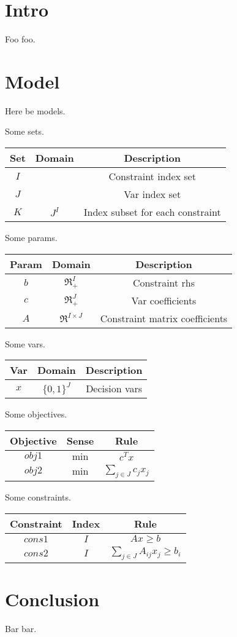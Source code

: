 \documentclass{article}
\begin{document}
\section{Intro}
Foo foo.

\section{Model}
Here be models.

Some sets.
\begin{tabular}{c|c|c} \label{tab:set}
    Set & Domain & Description \\
    \hline
    $I$ & & Constraint index set \\
    $J$ & & Var index set \\
    $K$ & $J^I$ & Index subset for each constraint \\
\end{tabular}

Some params.
\begin{tabular}{c|c|c} \label{tab:param}
    Param & Domain & Description \\
    \hline
    $b$ & $\Re^I_+$ & Constraint rhs \\
    $c$ & $\Re^J_+$ & Var coefficients \\
    $A$ & $\Re^{I \times J}$ & Constraint matrix coefficients \\
\end{tabular}

Some vars.
\begin{tabular}{c|c|c} \label{tab:var}
    Var & Domain & Description \\
    \hline
    $x$ & $\{0, 1\}^J$ & Decision vars \\
\end{tabular}

Some objectives.
\begin{tabular}{c|c|c} \label{tab:objective}
    Objective & Sense & Rule \\
    \hline
    $obj1$ & $\min$ & $c^Tx$ \\
    $obj2$ & $\min$ & $\sum_{j \in J} c_j x_j$ \\
\end{tabular}

Some constraints.
\begin{tabular}{c|c|c} \label{tab:constraint}
    Constraint & Index & Rule \\
    \hline
    $cons1$ & $I$ & $Ax \geq b$ \\
    $cons2$ & $I$ & $\sum_{j \in J} A_{ij} x_j \geq b_i$ \\
\end{tabular}

\section{Conclusion}
Bar bar.
\end{document}
